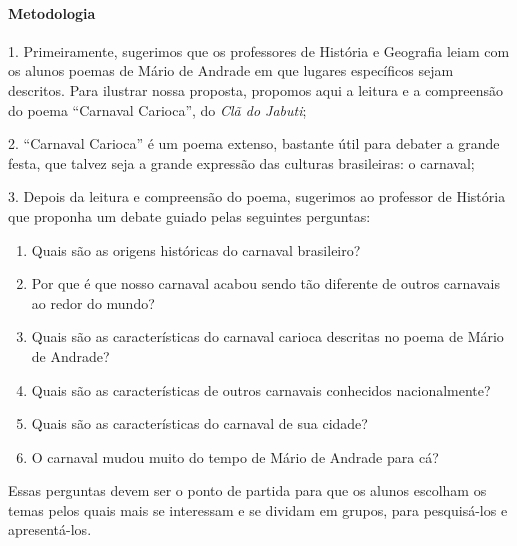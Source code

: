 \documentclass[11pt]{extarticle}
\begin{document}
\paragraph{Metodologia}


1. Primeiramente, sugerimos que os professores de História e Geografia
leiam com os alunos poemas de Mário de Andrade em que lugares
específicos sejam descritos. Para ilustrar nossa proposta, propomos aqui
a leitura e a compreensão do poema ``Carnaval Carioca'', do \emph{Clã do
Jabuti};

\vspace{3mm}

2. ``Carnaval Carioca'' é um poema extenso, bastante útil para debater a
grande festa, que talvez seja a grande expressão das culturas
brasileiras: o carnaval;

\vspace{3mm}

3. Depois da leitura e compreensão do poema, sugerimos ao professor de
História que proponha um debate guiado pelas seguintes perguntas:

\begin{enumerate}

\item Quais são as origens históricas do carnaval brasileiro?

\item Por que é que nosso carnaval acabou sendo tão diferente de outros
carnavais ao redor do mundo?

\item Quais são as características do carnaval carioca descritas no poema
de Mário de Andrade?

\item Quais são as características de outros carnavais conhecidos
nacionalmente?

\item Quais são as características do carnaval de sua cidade?

\item O carnaval mudou muito do tempo de Mário de Andrade para cá?

\end{enumerate} 

Essas perguntas devem ser o ponto de partida para que os alunos escolham
os temas pelos quais mais se interessam e se dividam em grupos, para
pesquisá-los e apresentá-los.
\end{document}
